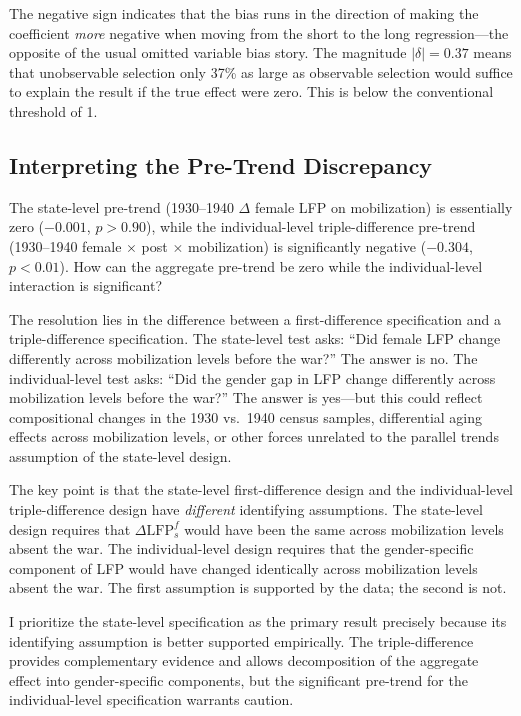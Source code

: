 \documentclass[12pt]{article}
\begin{document}
The negative sign indicates that the bias runs in the direction of making the coefficient \textit{more} negative when moving from the short to the long regression---the opposite of the usual omitted variable bias story. The magnitude $|\delta| = 0.37$ means that unobservable selection only 37\% as large as observable selection would suffice to explain the result if the true effect were zero. This is below the conventional threshold of 1.

\subsection{Interpreting the Pre-Trend Discrepancy}

The state-level pre-trend (1930--1940 $\Delta$ female LFP on mobilization) is essentially zero ($-0.001$, $p > 0.90$), while the individual-level triple-difference pre-trend (1930--1940 female $\times$ post $\times$ mobilization) is significantly negative ($-0.304$, $p < 0.01$). How can the aggregate pre-trend be zero while the individual-level interaction is significant?

The resolution lies in the difference between a first-difference specification and a triple-difference specification. The state-level test asks: ``Did female LFP change differently across mobilization levels before the war?'' The answer is no. The individual-level test asks: ``Did the gender gap in LFP change differently across mobilization levels before the war?'' The answer is yes---but this could reflect compositional changes in the 1930 vs.\ 1940 census samples, differential aging effects across mobilization levels, or other forces unrelated to the parallel trends assumption of the state-level design.

The key point is that the state-level first-difference design and the individual-level triple-difference design have \textit{different} identifying assumptions. The state-level design requires that $\Delta \text{LFP}^f_s$ would have been the same across mobilization levels absent the war. The individual-level design requires that the gender-specific component of LFP would have changed identically across mobilization levels absent the war. The first assumption is supported by the data; the second is not.

I prioritize the state-level specification as the primary result precisely because its identifying assumption is better supported empirically. The triple-difference provides complementary evidence and allows decomposition of the aggregate effect into gender-specific components, but the significant pre-trend for the individual-level specification warrants caution.
\end{document}
